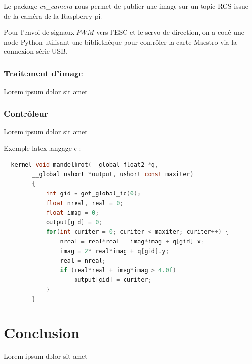 \documentclass[12pt, openany]{report}
\begin{document}
Le package \emph{cv\_camera} nous permet de publier une image sur un topic ROS issue de la caméra de la Raspberry pi.

Pour l'envoi de signaux $PWM$ vers l'ESC et le servo de direction, on a codé une node Python utilisant une bibliothèque pour contrôler la carte Maestro via
la connexion série USB.


\subsubsection{Traitement d'image}
Lorem ipsum dolor sit amet

\subsubsection{Contrôleur}
Lorem ipsum dolor sit amet

Exemple latex langage c :
\begin{lstlisting}[language=C]
        __kernel void mandelbrot(__global float2 *q, 
        __global ushort *output, ushort const maxiter)
        {
            int gid = get_global_id(0);
            float nreal, real = 0;
            float imag = 0;
            output[gid] = 0;
            for(int curiter = 0; curiter < maxiter; curiter++) {
                nreal = real*real - imag*imag + q[gid].x;
                imag = 2* real*imag + q[gid].y;
                real = nreal;
                if (real*real + imag*imag > 4.0f)
                    output[gid] = curiter;
            }
        }
      \end{lstlisting}

\section{Conclusion}
Lorem ipsum dolor sit amet




\end{document}
